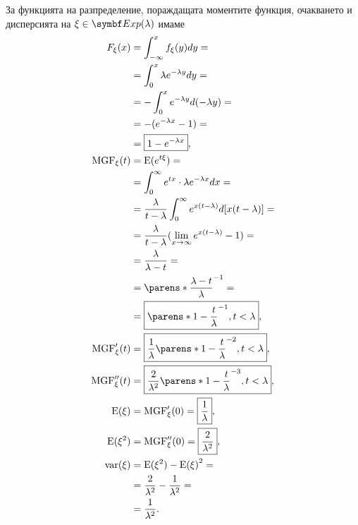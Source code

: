 \documentclass{../../common/topic}
\begin{document}
За функцията на разпределение, пораждащата моментите функция, очакването и дисперсията на \( \xi \in \distr{Exp}(\lambda) \) имаме
\begingroup
\allowdisplaybreaks
\begin{align*}
  F_\xi(x)
  &=
  \int_{-\infty}^x f_\xi(y) dy
  = \\ &=
  \int_0^x \lambda e^{-\lambda y} dy
  = \\ &=
  -\int_0^x e^{-\lambda y} d(-\lambda y)
  = \\ &=
  -(e^{-\lambda x} - 1)
  = \\ &=
  \boxed{1 - e^{-\lambda x}},
  \\
  \MGF_\xi(t)
  &=
  \Expect(e^{t\xi})
  = \\ &=
  \int_0^\infty e^{tx} \cdot \lambda e^{-\lambda x} dx
  = \\ &=
  \frac \lambda {t-\lambda} \int_0^\infty e^{x(t-\lambda)} d[x(t-\lambda)]
  = \\ &=
  \frac \lambda {t-\lambda} (\lim_{x \to \infty} e^{x(t-\lambda)} - 1)
  = \\ &=
  \frac \lambda {\lambda-t}
  = \\ &=
  {\parens*{\frac {\lambda-t} \lambda }}^{-1}
  = \\ &=
  \boxed{{\parens*{1 - \frac t \lambda }}^{-1}, t < \lambda},
  \\
  \MGF'_\xi(t)
  &=
  \boxed{\frac 1 \lambda {\parens*{1 - \frac t \lambda }}^{-2}, t < \lambda},
  \\
  \MGF''_\xi(t)
  &=
  \boxed{\frac 2 {\lambda^2} {\parens*{1 - \frac t \lambda }}^{-3}, t < \lambda},
  \\
  \Expect(\xi)
  &=
  \MGF'_\xi(0)
  =
  \boxed{\frac 1 \lambda},
  \\
  \Expect(\xi^2)
  &=
  \MGF''_\xi(0)
  =
  \boxed{\frac 2 {\lambda^2}},
  \\
  \var(\xi)
  &=
  \Expect(\xi^2) - {\Expect(\xi)}^2
  = \\ &=
  \frac 2 {\lambda^2} - \frac 1 {\lambda^2}
  = \\ &=
  \frac 1 {\lambda^2}.
\end{align*}
\endgroup
\end{document}
